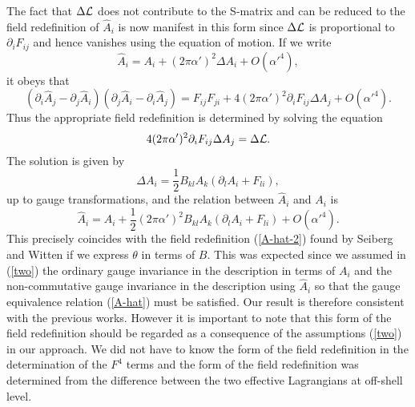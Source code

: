 \documentclass[a4paper,12pt]{article}
\begin{document}
The fact that $\Delta {\cal L}$ does not contribute
to the S-matrix and can be reduced to the field redefinition
of $\hat{A}_i$ is now manifest in this form
since $\Delta {\cal L}$ is proportional to $\partial_i F_{ij}$
and hence vanishes using the equation of motion.
If we write
\begin{equation}
\hat{A}_i = A_i + (2 \pi \alpha')^2 \Delta A_i + O(\alpha'^4),
\end{equation}
it obeys that
\begin{equation}
(\partial_i \hat{A}_j - \partial_j \hat{A}_i)
(\partial_j \hat{A}_i - \partial_i \hat{A}_j)
= F_{ij} F_{ji}
+ 4 (2 \pi \alpha')^2 \partial_i F_{ij} \Delta A_j
+ O(\alpha'^4).
\end{equation}
Thus the appropriate field redefinition is determined by
solving the equation
\begin{equation}
4 (2 \pi \alpha')^2 \partial_i F_{ij} \Delta A_j
= \Delta {\cal L}.
\end{equation}
The solution is given by
\begin{equation}
\Delta A_i = \frac{1}{2} B_{kl} A_k (\partial_l A_i + F_{li}),
\end{equation}
up to gauge transformations,
and the relation between $\hat{A}_i$ and $A_i$ is
\begin{equation}
\hat{A}_i = A_i + \frac{1}{2} (2 \pi \alpha')^2
B_{kl} A_k (\partial_l A_i + F_{li})
+ O(\alpha'^4).
\label{redefinition-1}
\end{equation}
This precisely coincides with the field redefinition
(\ref{A-hat-2}) found by Seiberg and Witten \cite{SW}
if we express $\theta$ in terms of $B$.
This was expected
since we assumed in (\ref{two})
the ordinary gauge invariance
in the description in terms of $A_i$ and
the non-commutative gauge invariance
in the description using $\hat{A}_i$
so that the gauge equivalence relation (\ref{A-hat})
must be satisfied.
Our result is therefore consistent with the previous works.
However it is important to note that
this form of the field redefinition should be regarded as
a consequence of the assumptions (\ref{two}) in our approach.
We did not have to know the form of the field redefinition
in the determination of the $F^4$ terms
and the form of the field redefinition was determined from
the difference between the two effective Lagrangians
at off-shell level.
\end{document}
